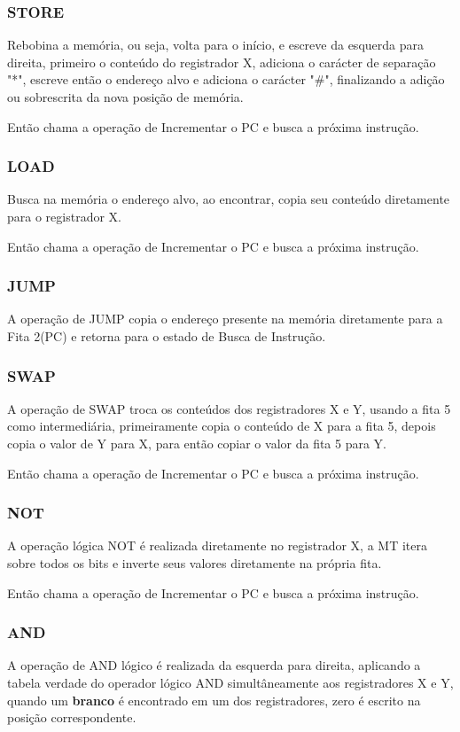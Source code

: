 \documentclass[a4paper,12pt]{article}
\begin{document}
\subsubsection*{STORE}
Rebobina a memória, ou seja, volta para o início, e escreve da esquerda para direita, primeiro o conteúdo do registrador X, adiciona o carácter de separação "*", escreve então o endereço alvo e adiciona o carácter "\#", finalizando a adição ou sobrescrita da nova posição de memória.

Então chama a operação de Incrementar o PC e busca a próxima instrução.

\subsubsection*{LOAD}
Busca na memória o endereço alvo, ao encontrar, copia seu conteúdo diretamente para o registrador X.

Então chama a operação de Incrementar o PC e busca a próxima instrução.

\subsubsection*{JUMP}
A operação de JUMP copia o endereço presente na memória diretamente para a Fita 2(PC) e retorna para o estado de Busca de Instrução.

\subsubsection*{SWAP}
A operação de SWAP troca os conteúdos dos registradores X e Y, usando a fita 5 como intermediária, primeiramente copia o conteúdo de X para a fita 5, depois copia o valor de Y para X, para então copiar o valor da fita 5 para Y.

Então chama a operação de Incrementar o PC e busca a próxima instrução.

\subsubsection*{NOT}
A operação lógica NOT é realizada diretamente no registrador X, a MT itera sobre todos os bits e inverte seus valores diretamente na própria fita.

Então chama a operação de Incrementar o PC e busca a próxima instrução.

\subsubsection*{AND}
A operação de AND lógico é realizada da esquerda para direita, aplicando a tabela verdade do operador lógico AND simultâneamente aos registradores X e Y, quando um \textbf{branco} é encontrado em um dos registradores, zero é escrito na posição correspondente.
\end{document}
